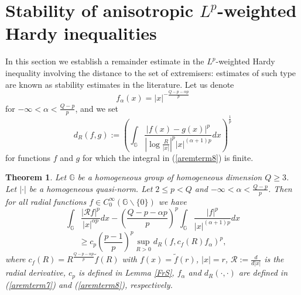 \documentclass[a4paper,12pt,reqno]{amsart}
\renewcommand\eqref[1]{(\ref{#1})} %
\numberwithin{equation}{section}
\theoremstyle{plain}
\newtheorem{thm}{Theorem}[section]
\theoremstyle{definition}
\begin{document}
\section{Stability of anisotropic $L^{p}$-weighted Hardy inequalities}
\label{stab}
In this section we establish a remainder estimate in the $L^{p}$-weighted Hardy inequality involving the distance to the set of extremisers: estimates of such type are known as stability estimates in the literature.
Let us denote
\begin{equation}\label{aremterm7}
f_{\alpha}(x)=|x|^{-\frac{Q-p-\alpha p}{p}}
\end{equation}
for $-\infty<\alpha<\frac{Q-p}{p}$, and we set
\begin{equation}\label{aremterm8}
d_{R}(f,g):=\left(\int_{\mathbb{G}}\frac{|f(x)-g(x)|^{p}}{\left|\log\frac{R}{|x|}\right|^{p}|x|^{(\alpha+1)p}}dx\right)^{\frac{1}{p}}
\end{equation}
for functions $f$ and $g$ for which the integral in \eqref{aremterm8} is finite.
\begin{thm}\label{aremterm_thm}
Let $\mathbb{G}$ be a homogeneous group
of homogeneous dimension $Q\geq3$. Let $|\cdot|$ be a homogeneous quasi-norm. Let $2\leq p<Q$ and $-\infty<\alpha<\frac{Q-p}{p}$. Then for all radial functions $f\in C_{0}^{\infty}(\mathbb{G}\backslash\{0\})$ we have
$$\int_{\mathbb{G}}\frac{|\mathcal{R}f|^{p}}{|x|^{\alpha p}}dx-\left(\frac{Q-p-\alpha p}{p}\right)^{p}\int_{\mathbb{G}}\frac{|f|^{p}}{|x|^{(\alpha+1)p}}dx$$
\begin{equation}\label{aremterm9}
\geq c_{p}\left(\frac{p-1}{p}\right)^{p}\sup_{R>0}d_{R}(f,c_{f}(R)f_{\alpha})^{p},
\end{equation}
where $c_{f}(R)=R^{\frac{Q-p-\alpha p}{p}}\widetilde{f}(R)$ with $f(x)=\widetilde{f}(r)$, $|x|=r$, $\mathcal{R}:=\frac{d}{d|x|}$ is the radial derivative, $c_{p}$ is defined in Lemma \ref{FrS}, $f_{\alpha}$ and $d_{R}(\cdot,\cdot)$ are defined in \eqref{aremterm7} and \eqref{aremterm8}, respectively.
\end{thm}
\end{document}

